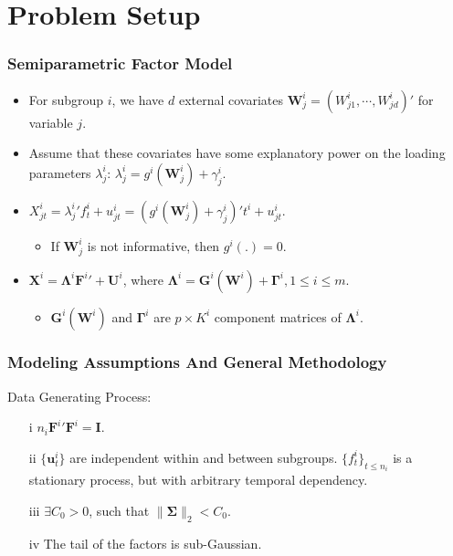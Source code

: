 \documentclass{beamer}
\begin{document}
\section{Problem Setup}

\begin{frame}
\frametitle{Semiparametric Factor Model}

\begin{itemize}
	\item For subgroup $i$, we have $d$ external covariates $\mathbf{W}_j^i = (W_{j1}^i, \cdots, W_{jd}^i)'$ for variable $j$.
	\item Assume that these covariates have some explanatory power on the loading parameters $\lambda_j^i$: $\lambda_j^i = g^i(\mathbf{W}_j^i) + \gamma_j^i$.
	\item $X_{jt}^i = {\lambda_j^i}'f_t^i + u_{jt}^i = (g^i(\mathbf{W}_j^i) + \gamma_j^i)' t^i + u_{jt}^i$.
	\begin{itemize}
		\item If $\mathbf{W}_j^i$ is not informative, then $g^i(.) = 0$.
	\end{itemize}
	\item $\mathbf{X}^i = \boldsymbol{\Lambda}^i {\mathbf{F}^i}' + \mathbf{U}^i$, where $\boldsymbol{\Lambda}^i = \mathbf{G}^i(\mathbf{W}^i) + \boldsymbol{\Gamma}^i, 1 \leq i \leq m$.    
	\begin{itemize}
		\item $\mathbf{G}^i(\mathbf{W}^i)$ and $\boldsymbol{\Gamma}^i$ are $p \times K^i$ component matrices of $\boldsymbol{\Lambda}^i$.
	\end{itemize}
\end{itemize}	
\end{frame}


\begin{frame}
	\frametitle{Modeling Assumptions And General Methodology}
	Data Generating Process:
	\begin{itemize}
		\item[i] $n_i {\mathbf{F}^i}'\mathbf{F}^i = \mathbf{I}$.
		\item[ii] $\{\mathbf{u}_t^i\}$ are independent within and between subgroups. $\{f_t^i\}_{t \leq n_i}$ is a stationary process, but with arbitrary temporal dependency.
		\item[iii] $\exists C_0 > 0$, such that $\|\boldsymbol{\Sigma}\|_2 < C_0$.
		\item[iv] The tail of the factors is sub-Gaussian.
	\end{itemize}
	
\end{frame}
\end{document}
